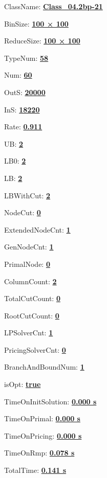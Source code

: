 \documentclass[11pt]{article}
\begin{document}
\pagestyle{empty}


ClassName: \underline{\textbf{Class_04.2bp-21}}
\par
BinSize: \underline{\textbf{100 × 100}}
\par
ReduceSize: \underline{\textbf{100 × 100}}
\par
TypeNum: \underline{\textbf{58}}
\par
Num: \underline{\textbf{60}}
\par
OutS: \underline{\textbf{20000}}
\par
InS: \underline{\textbf{18220}}
\par
Rate: \underline{\textbf{0.911}}
\par
UB: \underline{\textbf{2}}
\par
LB0: \underline{\textbf{2}}
\par
LB: \underline{\textbf{2}}
\par
LBWithCut: \underline{\textbf{2}}
\par
NodeCut: \underline{\textbf{0}}
\par
ExtendedNodeCnt: \underline{\textbf{1}}
\par
GenNodeCnt: \underline{\textbf{1}}
\par
PrimalNode: \underline{\textbf{0}}
\par
ColumnCount: \underline{\textbf{2}}
\par
TotalCutCount: \underline{\textbf{0}}
\par
RootCutCount: \underline{\textbf{0}}
\par
LPSolverCnt: \underline{\textbf{1}}
\par
PricingSolverCnt: \underline{\textbf{0}}
\par
BranchAndBoundNum: \underline{\textbf{1}}
\par
isOpt: \underline{\textbf{true}}
\par
TimeOnInitSolution: \underline{\textbf{0.000 s}}
\par
TimeOnPrimal: \underline{\textbf{0.000 s}}
\par
TimeOnPricing: \underline{\textbf{0.000 s}}
\par
TimeOnRmp: \underline{\textbf{0.078 s}}
\par
TotalTime: \underline{\textbf{0.141 s}}
\par
\newpage
\end{document}
